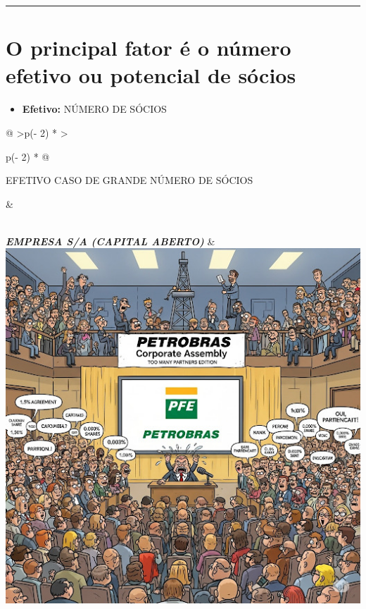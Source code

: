 \documentclass[
]{book}
\providecommand{\tightlist}{%
  \setlength{\itemsep}{0pt}\setlength{\parskip}{0pt}}
\begin{document}
\begin{center}\rule{0.5\linewidth}{0.5pt}\end{center}

\section{O principal fator é o número efetivo ou potencial de sócios}\label{o-principal-fator-uxe9-o-nuxfamero-efetivo-ou-potencial-de-suxf3cios}

\begin{itemize}
\tightlist
\item
  \textbf{Efetivo:} NÚMERO DE SÓCIOS
\end{itemize}

\begin{longtable}[]{@{}
  >{\centering\arraybackslash}p{(\columnwidth - 2\tabcolsep) * }
  >{\raggedright\arraybackslash}p{(\columnwidth - 2\tabcolsep) * }@{}}
\toprule\noalign{}
\begin{minipage}[b]{\linewidth}\centering
EFETIVO CASO DE GRANDE NÚMERO DE SÓCIOS
\end{minipage} & \begin{minipage}[b]{\linewidth}\raggedright
\end{minipage} \\
\midrule\noalign{}
\endhead
\bottomrule\noalign{}
\endlastfoot
\textbf{\emph{EMPRESA S/A (CAPITAL ABERTO)}} & \includegraphics{images/02-2025-08-12_13/00-PetroBras.jpg} \\
\end{longtable}
\end{document}
